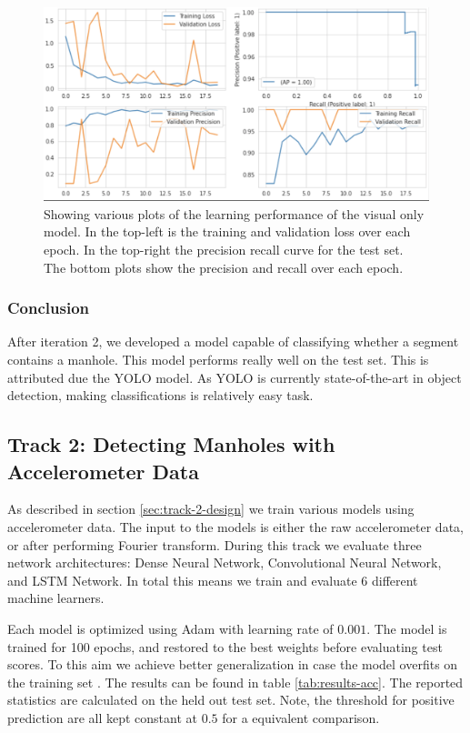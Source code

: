 \begin{figure}[ht]
\begin{center}
\includegraphics[width=.80\textwidth,keepaspectratio]{images/6_results/visual-learning.png}
\end{center}
\captionsetup{width=.90\textwidth}
\caption{Showing various plots of the learning performance of the visual only model. In the top-left is the training and validation loss over each epoch. In the top-right the precision recall curve for the test set. The bottom plots show the precision and recall over each epoch.}
\label{fig:results-visual-plots}
\end{figure}


\subsubsection{Conclusion}

After iteration 2, we developed a model capable of classifying whether a segment contains a manhole. This model performs really well on the test set. This is attributed due the YOLO model. As YOLO is currently state-of-the-art in object detection, making classifications is relatively easy task.


\subsection{Track 2: Detecting Manholes with Accelerometer Data}

As described in section \ref{sec:track-2-design} we train various models using accelerometer data. The input to the models is either the raw accelerometer data, or after performing Fourier transform. During this track we evaluate three network architectures: Dense Neural Network, Convolutional Neural Network, and LSTM Network. In total this means we train and evaluate 6 different machine learners.

Each model is optimized using Adam with learning rate of $0.001$. The model is trained for 100 epochs, and restored to the best weights before evaluating test scores. To this aim we achieve better generalization in case the model overfits on the training set \cite{Goodfellow2016}. The results can be found in table \ref{tab:results-acc}. The reported statistics are calculated on the held out test set. Note, the threshold for positive prediction are all kept constant at $0.5$ for a equivalent comparison.

